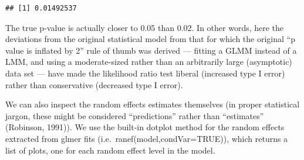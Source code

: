 \documentclass[
  12pt,
]{book}
\begin{document}
\begin{verbatim}
## [1] 0.01492537
\end{verbatim}

The true p-value is actually closer to 0.05 than 0.02. In other words, here the deviations from the original statistical model from that for which the original ``p value is inflated by 2'' rule of thumb was derived --- fitting a GLMM instead of a LMM, and using a moderate-sized rather than an arbitrarily large (asymptotic) data set --- have made the likelihood ratio test liberal (increased type I error) rather than conservative (decreased type I error).

We can also inspect the random effects estimates themselves (in proper statistical jargon, these might be considered ``predictions'' rather than ``estimates'' (Robinson, 1991)). We use the built-in dotplot method for the random effects extracted from glmer fits (i.e.~ranef(model,condVar=TRUE)), which returns a list of plots, one for each random effect level in the model.
\end{document}
